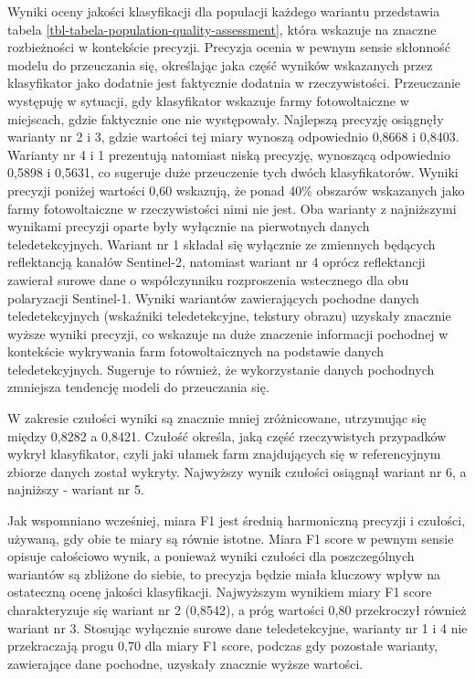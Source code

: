 \documentclass{amuthesis}
\begin{document}
Wyniki oceny jakości klasyfikacji dla populacji każdego wariantu
przedstawia tabela \ref{tbl-tabela-population-quality-assessment}, która
wskazuje na znaczne rozbieżności w kontekście precyzji. Precyzja ocenia
w pewnym sensie skłonność modelu do przeuczania się, określając jaka
część wyników wskazanych przez klasyfikator jako dodatnie jest
faktycznie dodatnia w rzeczywistości. Przeuczanie występuję w sytuacji,
gdy klasyfikator wskazuje farmy fotowoltaiczne w miejscach, gdzie
faktycznie one nie występowały. Najlepszą precyzję osiągnęły warianty nr
2 i 3, gdzie wartości tej miary wynoszą odpowiednio 0,8668 i 0,8403.
Warianty nr 4 i 1 prezentują natomiast niską precyzję, wynoszącą
odpowiednio 0,5898 i 0,5631, co sugeruje duże przeuczenie tych dwóch
klasyfikatorów. Wyniki precyzji poniżej wartości 0,60 wskazują, że ponad
40\% obszarów wskazanych jako farmy fotowoltaiczne w rzeczywistości nimi
nie jest. Oba warianty z najniższymi wynikami precyzji oparte były
wyłącznie na pierwotnych danych teledetekcyjnych. Wariant nr 1 składał
się wyłącznie ze zmiennych będących reflektancją kanałów Sentinel-2,
natomiast wariant nr 4 oprócz reflektancji zawierał surowe dane o
współczynniku rozproszenia wstecznego dla obu polaryzacji Sentinel-1.
Wyniki wariantów zawierających pochodne danych teledetekcyjnych
(wskaźniki teledetekcyjne, tekstury obrazu) uzyskały znacznie wyższe
wyniki precyzji, co wskazuje na duże znaczenie informacji pochodnej w
kontekście wykrywania farm fotowoltaicznych na podstawie danych
teledetekcyjnych. Sugeruje to również, że wykorzystanie danych
pochodnych zmniejsza tendencję modeli do przeuczania się.

W zakresie czułości wyniki są znacznie mniej zróżnicowane, utrzymując
się między 0,8282 a 0,8421. Czułość określa, jaką część rzeczywistych
przypadków wykrył klasyfikator, czyli jaki ułamek farm znajdujących się
w referencyjnym zbiorze danych został wykryty. Najwyższy wynik czułości
osiągnął wariant nr 6, a najniższy - wariant nr 5.

Jak wspomniano wcześniej, miara F1 jest średnią harmoniczną precyzji i
czułości, używaną, gdy obie te miary są równie istotne. Miara F1 score w
pewnym sensie opisuje całościowo wynik, a ponieważ wyniki czułości dla
poszczególnych wariantów są zbliżone do siebie, to precyzja będzie miała
kluczowy wpływ na ostateczną ocenę jakości klasyfikacji. Najwyższym
wynikiem miary F1 score charakteryzuje się wariant nr 2 (0,8542), a próg
wartości 0,80 przekroczył również wariant nr 3. Stosując wyłącznie
surowe dane teledetekcyjne, warianty nr 1 i 4 nie przekraczają progu
0,70 dla miary F1 score, podczas gdy pozostałe warianty, zawierające
dane pochodne, uzyskały znacznie wyższe wartości.
\end{document}
